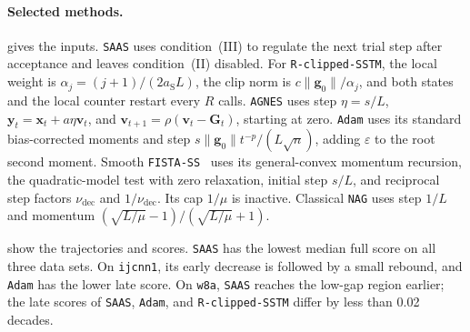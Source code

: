 \documentclass{article}
\begin{document}
\paragraph{Selected methods.}
 gives the inputs.
\texttt{SAAS} uses condition~\textnormal{(III)} to regulate the next
trial step after acceptance and leaves condition~\textnormal{(II)} disabled.
For \texttt{R-clipped-SSTM}, the local weight is
\(\alpha_j=(j+1)/(2a_{\mathrm S}L)\), the clip norm is
\(c\|\bm g_0\|/\alpha_j\), and both states and the local counter
restart every \(R\) calls. \texttt{AGNES} uses step \(\eta=s/L\),
\(\bm y_t=\bm x_t+a\eta\bm v_t\), and
\(\bm v_{t+1}=\rho(\bm v_t-\mathbf G_t)\), starting at zero.
\texttt{Adam} uses its standard bias-corrected moments and step
\(s\|\bm g_0\|t^{-p}/(L\sqrt n)\), adding \(\varepsilon\) to the
root second moment. Smooth \texttt{FISTA-SS}~\cite{stoFISTA} uses
its general-convex momentum recursion, the quadratic-model test with
zero relaxation, initial step \(s/L\), and reciprocal step factors
\(\nu_{\mathrm{dec}}\) and \(1/\nu_{\mathrm{dec}}\).
Its cap \(1/\mu\) is inactive. Classical \texttt{NAG} uses step
\(1/L\) and momentum \((\sqrt{L/\mu}-1)/(\sqrt{L/\mu}+1)\).

show the trajectories and scores. \texttt{SAAS} has the lowest median
full score on all three data sets. On \texttt{ijcnn1}, its early decrease
is followed by a small rebound, and \texttt{Adam} has the lower late
score. On \texttt{w8a}, \texttt{SAAS} reaches the low-gap region earlier;
the late scores of \texttt{SAAS}, \texttt{Adam}, and
\texttt{R-clipped-SSTM} differ by less than 0.02 decades.
\end{document}
